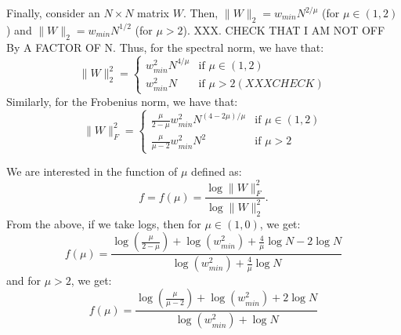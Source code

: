 Finally, consider an $N \times N$ matrix $W$. 
Then, 
$\|W\|_2 = w_{min} N^{2/\mu}$ (for $\mu\in(1,2)$) and
$\|W\|_2 = w_{min} N^{1/2}$ (for $\mu>2$).
XXX.  CHECK THAT I AM NOT OFF By A FACTOR OF N.
Thus, for the spectral norm, we have that: 
\begin{equation}
\|W\|_2^2 = \left\{ \begin{array}{ll}
                       w_{min}^2 N^{4/\mu} & \mbox{if $\mu\in(1,2)$} \\
                       w_{min}^2 N & \mbox{if $\mu > 2$} (XXX CHECK)
                    \end{array}
            \right.
\end{equation}
Similarly, for the Frobenius norm, we have that:
\begin{equation}
\|W\|_F^2 = \left\{ \begin{array}{ll}
                      \frac{\mu}{2-\mu} w_{min}^2 N^{(4-2\mu)/\mu} & \mbox{if $\mu\in(1,2)$} \\
                      \frac{\mu}{\mu-2} w_{min}^2 N^2 & \mbox{if $\mu > 2$} 
                    \end{array}
            \right.
\end{equation}

We are interested in the function of $\mu$ defined as:
$$
f = f(\mu) = \frac{\log \|W\|_F^2}{\log \|W\|_2^2}  .
$$
From the above, if we take logs, then for $\mu\in(1,0)$, we get:
$$
f(\mu) = \frac{ \log\left(\frac{\mu}{2-\mu}\right) + \log(w_{min}^2) + \frac{4}{\mu}\log N - 2 \log N }{ \log(w_{min}^2) + \frac{4}{\mu}\log N }
$$
and for $\mu > 2$, we get:
$$
f(\mu) = \frac{ \log\left(\frac{\mu}{\mu-2}\right) + \log(w_{min}^2) + 2 \log N }{ \log(w_{min}^2) + \log N }
$$


